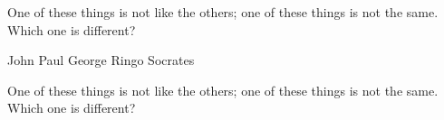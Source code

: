 \documentclass[a4paper,answers,addpoints]{exam}
\begin{document}
\begin{questions}
\question[5]
One of these things is not like the others; one of these
things is not the same. Which one is different?

\begin{choices}
\choice John
\choice Paul
\choice George
\choice Ringo
\CorrectChoice Socrates
\end{choices}
\question[5]
One of these things is not like the others; one of these
things is not the same. Which one is different?


\end{questions}
\end{document}

